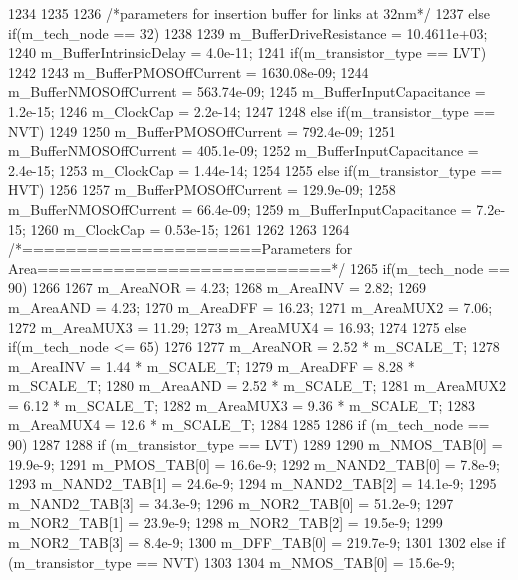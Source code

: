 \begin{DoxyCode}
{{{1234         }
1235     }
1236     /*parameters for insertion buffer for links at 32nm*/
1237     else if(m_tech_node == 32)
1238     {
1239         m_BufferDriveResistance      = 10.4611e+03;
1240         m_BufferIntrinsicDelay       = 4.0e-11;
1241         if(m_transistor_type == LVT)
1242         {
1243             m_BufferPMOSOffCurrent       = 1630.08e-09;
1244             m_BufferNMOSOffCurrent       = 563.74e-09;
1245             m_BufferInputCapacitance     = 1.2e-15;
1246             m_ClockCap                   = 2.2e-14;
1247         }
1248         else if(m_transistor_type == NVT)
1249         {
1250             m_BufferPMOSOffCurrent       = 792.4e-09;
1251             m_BufferNMOSOffCurrent       = 405.1e-09;
1252             m_BufferInputCapacitance     = 2.4e-15;
1253             m_ClockCap                   = 1.44e-14;
1254         }
1255         else if(m_transistor_type == HVT)
1256         {
1257             m_BufferPMOSOffCurrent       = 129.9e-09;
1258             m_BufferNMOSOffCurrent       = 66.4e-09;
1259             m_BufferInputCapacitance     = 7.2e-15;
1260             m_ClockCap                   = 0.53e-15;
1261         }
1262     }
1263 
1264     /*======================Parameters for Area===========================*/
1265     if(m_tech_node == 90)
1266     {
1267         m_AreaNOR = 4.23;
1268         m_AreaINV = 2.82;
1269         m_AreaAND = 4.23;
1270         m_AreaDFF = 16.23;
1271         m_AreaMUX2 = 7.06;
1272         m_AreaMUX3 = 11.29;
1273         m_AreaMUX4 = 16.93;
1274     }
1275     else if(m_tech_node <= 65)
1276     {
1277         m_AreaNOR = 2.52 * m_SCALE_T;
1278         m_AreaINV = 1.44 * m_SCALE_T;
1279         m_AreaDFF = 8.28 * m_SCALE_T;
1280         m_AreaAND = 2.52 * m_SCALE_T;
1281         m_AreaMUX2 = 6.12 * m_SCALE_T;
1282         m_AreaMUX3 = 9.36 * m_SCALE_T;
1283         m_AreaMUX4 = 12.6 * m_SCALE_T;
1284     }
1285 
1286     if (m_tech_node == 90)
1287     {
1288         if (m_transistor_type == LVT)
1289         {
1290             m_NMOS_TAB[0] = 19.9e-9;
1291             m_PMOS_TAB[0] = 16.6e-9;
1292             m_NAND2_TAB[0] = 7.8e-9;
1293             m_NAND2_TAB[1] = 24.6e-9;
1294             m_NAND2_TAB[2] = 14.1e-9;
1295             m_NAND2_TAB[3] = 34.3e-9;
1296             m_NOR2_TAB[0] = 51.2e-9;
1297             m_NOR2_TAB[1] = 23.9e-9;
1298             m_NOR2_TAB[2] = 19.5e-9;
1299             m_NOR2_TAB[3] = 8.4e-9;
1300             m_DFF_TAB[0] = 219.7e-9;
1301         }
1302         else if (m_transistor_type == NVT)
1303         {
1304             m_NMOS_TAB[0] = 15.6e-9;
}}}
\end{DoxyCode}
